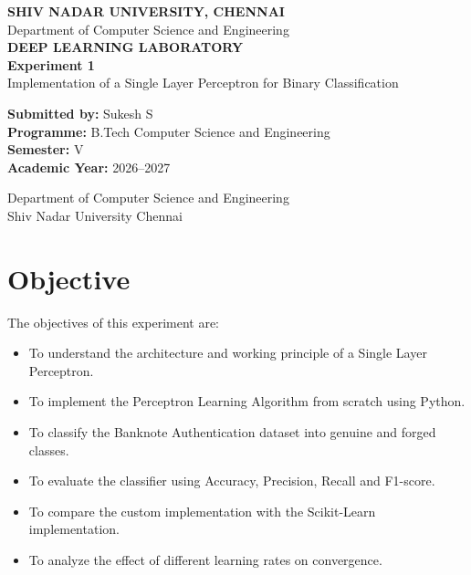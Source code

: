 \documentclass[12pt,a4paper]{article}
\begin{document}
\begin{titlepage}
\centering

\vspace*{1cm}

{\Large \textbf{SHIV NADAR UNIVERSITY, CHENNAI}}\\[0.4cm]

{\large Department of Computer Science and Engineering}\\[1.5cm]

{\Huge \textbf{DEEP LEARNING LABORATORY}}\\[0.8cm]

{\LARGE \textbf{Experiment 1}}\\[0.4cm]

{\Large Implementation of a Single Layer Perceptron for Binary Classification}\\[2cm]

\begin{flushleft}
\textbf{Submitted by:} Sukesh S\\[0.2cm]
\textbf{Programme:} B.Tech Computer Science and Engineering\\[0.2cm]
\textbf{Semester:} V\\[0.2cm]
\textbf{Academic Year:} 2026--2027
\end{flushleft}

\vfill

{\large Department of Computer Science and Engineering\\
Shiv Nadar University Chennai}

\end{titlepage}


\section{Objective}

The objectives of this experiment are:

\begin{itemize}
\item To understand the architecture and working principle of a Single Layer Perceptron.
\item To implement the Perceptron Learning Algorithm from scratch using Python.
\item To classify the Banknote Authentication dataset into genuine and forged classes.
\item To evaluate the classifier using Accuracy, Precision, Recall and F1-score.
\item To compare the custom implementation with the Scikit-Learn implementation.
\item To analyze the effect of different learning rates on convergence.
\end{itemize}
\end{document}
